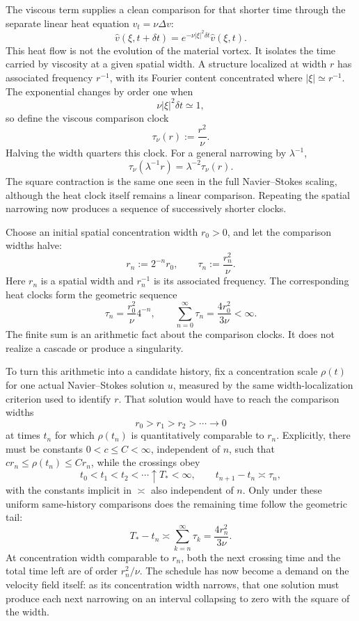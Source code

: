 
The viscous term supplies a clean comparison for that shorter time through the separate linear heat equation \(v_t=\nu\Delta v\):
\[
  \widehat v(\xi,t+\delta t)
  =
  e^{-\nu|\xi|^2\delta t}\widehat v(\xi,t).
\]
This heat flow is not the evolution of the material vortex. It isolates the time carried by viscosity at a given spatial width. A structure localized at width \(r\) has associated frequency \(r^{-1}\), with its Fourier content concentrated where \(|\xi|\simeq r^{-1}\). The exponential changes by order one when
\[
  \nu|\xi|^2\delta t\simeq1,
\]
so define the viscous comparison clock
\[
  \tau_\nu(r)
  :=
  \frac{r^2}{\nu}.
\]
Halving the width quarters this clock. For a general narrowing by \(\lambda^{-1}\),
\[
  \tau_\nu(\lambda^{-1}r)
  =
  \lambda^{-2}\tau_\nu(r).
\]
The square contraction is the same one seen in the full Navier--Stokes scaling, although the heat clock itself remains a linear comparison. Repeating the spatial narrowing now produces a sequence of successively shorter clocks.


Choose an initial spatial concentration width \(r_0>0\), and let the comparison widths halve:
\[
  r_n:=2^{-n}r_0,
  \qquad
  \tau_n:=\frac{r_n^2}{\nu}.
\]
Here \(r_n\) is a spatial width and \(r_n^{-1}\) is its associated frequency. The corresponding heat clocks form the geometric sequence
\[
  \tau_n
  =
  \frac{r_0^2}{\nu}4^{-n},
  \qquad
  \sum_{n=0}^{\infty}\tau_n
  =
  \frac{4r_0^2}{3\nu}
  <
  \infty.
\]
The finite sum is an arithmetic fact about the comparison clocks. It does not realize a cascade or produce a singularity.

To turn this arithmetic into a candidate history, fix a concentration scale \(\rho(t)\) for one actual Navier--Stokes solution \(u\), measured by the same width-localization criterion used to identify \(r\). That solution would have to reach the comparison widths
\[
  r_0>r_1>r_2>\cdots\longrightarrow0
\]
at times \(t_n\) for which \(\rho(t_n)\) is quantitatively comparable to \(r_n\). Explicitly, there must be constants \(0<c\leq C<\infty\), independent of \(n\), such that \(c r_n\leq\rho(t_n)\leq C r_n\), while the crossings obey
\[
  t_0<t_1<t_2<\cdots\uparrow T_*<\infty,
  \qquad
  t_{n+1}-t_n\asymp\tau_n,
\]
with the constants implicit in \(\asymp\) also independent of \(n\). Only under these uniform same-history comparisons does the remaining time follow the geometric tail:
\[
  T_*-t_n
  \asymp
  \sum_{k=n}^{\infty}\tau_k
  =
  \frac{4r_n^2}{3\nu}.
\]
At concentration width comparable to \(r_n\), both the next crossing time and the total time left are of order \(r_n^2/\nu\). The schedule has now become a demand on the velocity field itself: as its concentration width narrows, that one solution must produce each next narrowing on an interval collapsing to zero with the square of the width.

